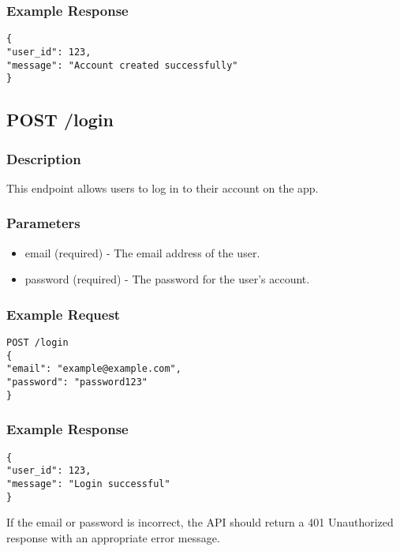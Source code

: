 \documentclass{article}
\begin{document}
\subsubsection{Example Response}

\begin{verbatim}
{
"user_id": 123,
"message": "Account created successfully"
}
\end{verbatim}

\subsection{POST /login}

\subsubsection{Description}

This endpoint allows users to log in to their account on the app.

\subsubsection{Parameters}

\begin{itemize}
\item email (required) - The email address of the user.
\item password (required) - The password for the user's account.
\end{itemize}

\subsubsection{Example Request}

\begin{verbatim}
POST /login
{
"email": "example@example.com",
"password": "password123"
}
\end{verbatim}

\subsubsection{Example Response}

\begin{verbatim}
{
"user_id": 123,
"message": "Login successful"
}
\end{verbatim}

If the email or password is incorrect, the API should return a 401 Unauthorized response with an appropriate error message.
\end{document}
